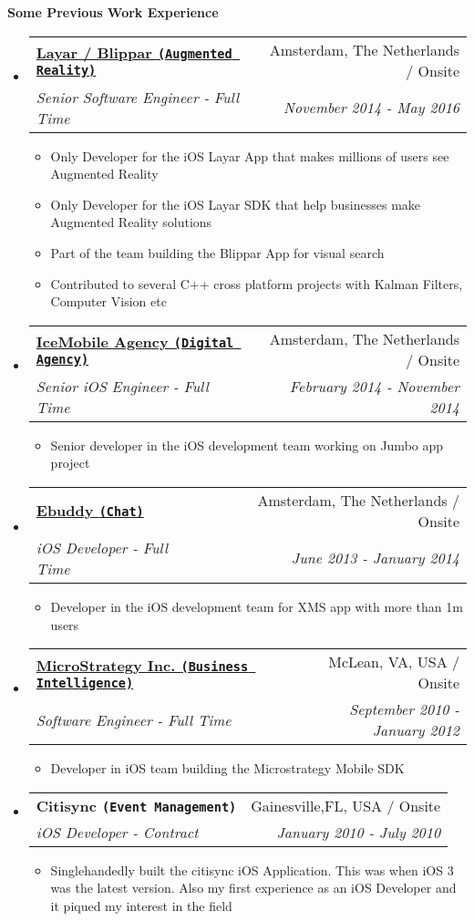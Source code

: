 \documentclass[letterpaper,11pt]{article}
\makeatletter
\newcommand{\resitem}[1]{\item #1 \vspace{-2pt}}
\newcommand{\resheading}[1]{{\large \colorbox{mygrey}{\begin{minipage}{\textwidth}{\textbf{#1 \vphantom{p\^{E}}}}\end{minipage}}}}
\newcommand{\ressubheading}[4]{
\begin{tabular*}{7.0in}{l@{\extracolsep{\fill}}r}
    \textbf{#1} & #2 \\
    \textit{#3} & \textit{#4} \\
\end{tabular*}\vspace{-6pt}}
\makeatother
\begin{document}
\resheading{Some Previous Work Experience}
\begin{itemize}

\item
    \ressubheading{\href{https://www.layar.com/}{Layar / Blippar \texttt{(Augmented Reality)}}}{Amsterdam, The Netherlands / Onsite}{Senior Software Engineer - Full Time}{November 2014 - May 2016}
    \begin{itemize}
        \resitem{Only Developer for the iOS Layar App that makes millions of users see Augmented Reality}
        \resitem{Only Developer for the iOS Layar SDK that help businesses make Augmented Reality solutions}
        \resitem{Part of the team building the Blippar App for visual search}
        \resitem{Contributed to several C++ cross platform projects with Kalman Filters, Computer Vision etc}
    \end{itemize}

\item
    \ressubheading{\href{http://www.icemobile.com}{IceMobile Agency \texttt{(Digital Agency)}}}{Amsterdam, The Netherlands / Onsite}{Senior iOS Engineer - Full Time}{February 2014 - November 2014}
    \begin{itemize}
        \resitem{Senior developer in the iOS development team working on Jumbo app project}
    \end{itemize}

\item
    \ressubheading{\href{http://www.ebuddy.com}{Ebuddy \texttt{(Chat)}}}{Amsterdam, The Netherlands / Onsite}{iOS Developer - Full Time}{June 2013 - January 2014}
    \begin{itemize}
        \resitem{Developer in the iOS development team for XMS app with more than 1m users}
    \end{itemize}

\item
    \ressubheading{\href{http://www.microstrategy.com/Company}{MicroStrategy Inc. \texttt{(Business Intelligence)}}}{McLean, VA, USA / Onsite}{Software Engineer - Full Time}{September 2010 - January 2012}
    \begin{itemize}
        \resitem{Developer in iOS team building the Microstrategy Mobile SDK}
    \end{itemize}
    

\item
    \ressubheading{Citisync \texttt{(Event Management)}}{Gainesville,FL, USA / Onsite}{iOS Developer - Contract}{January 2010 - July 2010}
    \begin{itemize}
        \resitem{Singlehandedly built the citisync iOS Application. This was when iOS 3 was the latest version. Also my first experience as an iOS Developer and it piqued my interest in the field}
    \end{itemize}
                

\end{itemize}
\end{document}
